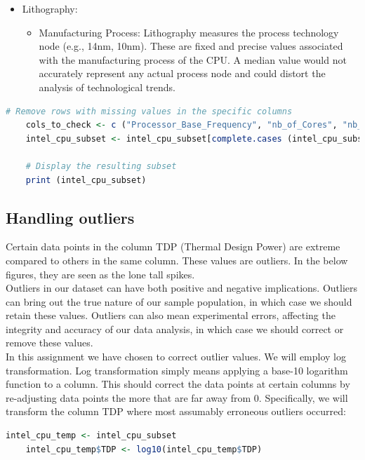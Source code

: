 \begin{itemize}
    \item Lithography:
    \begin{itemize}
        \item Manufacturing Process: Lithography measures the process technology node (e.g., 14nm, 10nm). These are fixed and precise values associated with the manufacturing process of the CPU. A median value would not accurately represent any actual process node and could distort the analysis of technological trends.
    \end{itemize}
\end{itemize}

\begin{lstlisting}[language=R]
    # Remove rows with missing values in the specific columns
    cols_to_check <- c ("Processor_Base_Frequency", "nb_of_Cores", "nb_of_Threads", "TDP", "Lithography")
    intel_cpu_subset <- intel_cpu_subset[complete.cases (intel_cpu_subset[, cols_to_check]), ]

    # Display the resulting subset
    print (intel_cpu_subset)
\end{lstlisting}

\subsection{Handling outliers}
Certain data points in the column TDP (Thermal Design Power) are extreme compared to others in the same column. These values are outliers. In the below figures, they are seen as the lone tall spikes.\\

Outliers in our dataset can have both positive and negative implications. Outliers can bring out the true nature of our sample population, in which case we should retain these values. Outliers can also mean experimental errors, affecting the integrity and accuracy of our data analysis, in which case we should correct or remove these values.\\

In this assignment we have chosen to correct outlier values. We will employ log transformation. Log transformation simply means applying a base-10 logarithm function to a column. This should correct the data points at certain columns by re-adjusting data points the more that are far away from 0. Specifically, we will transform the column TDP where most assumably erroneous outliers occurred:
\begin{lstlisting}[language=R]
    intel_cpu_temp <- intel_cpu_subset
    intel_cpu_temp$TDP <- log10(intel_cpu_temp$TDP)
\end{lstlisting}

